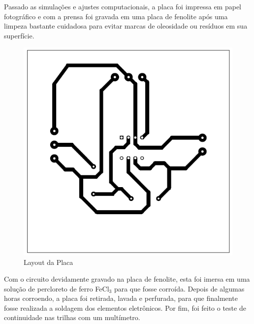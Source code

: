 \documentclass[14pt, oneside]{book}
\newcommand\tab[1][1cm]{\hspace*{#1}}
\theoremstyle{definition}
\begin{document}
                \tab Passado as simulações e ajustes computacionais, a placa foi impressa em papel fotográfico e com a prensa foi gravada em uma placa de fenolite após uma limpeza bastante cuidadosa para evitar marcas de oleosidade ou resíduos em sua superfície. \\
                \begin{figure}[H]
                    \centering
                    \includegraphics[scale= 0.8]{Layout_Placa}
                    \caption{Layout da Placa}
                    \label{fig:my_label5}
                \end{figure}
                \tab Com o circuito devidamente gravado na placa de fenolite, esta foi imersa em uma solução de percloreto de ferro FeCl$_3$ para que fosse corroída. Depois de algumas horas corroendo, a placa foi retirada, lavada e perfurada, para que finalmente fosse realizada a soldagem dos elementos eletrônicos. Por fim, foi feito o teste de continuidade nas trilhas com um multímetro.
            
\end{document}

